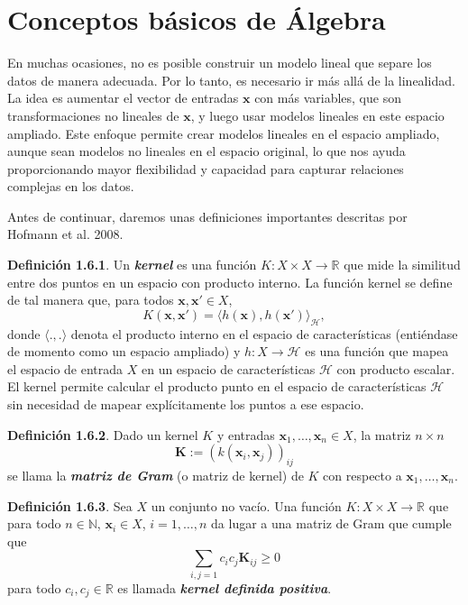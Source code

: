 \documentclass[letterpaper,12pt,oneside]{book}
\begin{document}
{\section{Conceptos básicos de Álgebra}
{
En muchas ocasiones, no es posible construir un modelo lineal que separe los datos de manera adecuada. Por lo tanto, es necesario ir más allá de la linealidad. La idea es aumentar el vector de entradas \( \textbf{x} \) con más variables, que son transformaciones no lineales de \( \textbf{x} \), y luego usar modelos lineales en este espacio ampliado. Este enfoque permite crear modelos lineales en el espacio ampliado, aunque sean modelos no lineales en el espacio original, lo que nos ayuda proporcionando mayor flexibilidad y capacidad para capturar relaciones complejas en los datos.

Antes de continuar, daremos unas definiciones importantes descritas por Hofmann et al. 2008.

    
    \textbf{Definición 1.6.1}. Un \textbf{\textit{kernel}} es una función \( K: X \times X \to \mathbb{R} \) que mide la similitud entre dos puntos en un espacio con producto interno. La función kernel se define de tal manera que, para todos \( \mathbf{x}, \mathbf{x}' \in X \),
    \begin{equation}
     K(\mathbf{x}, \mathbf{x}') = \langle h(\mathbf{x}), h(\mathbf{x}')\rangle_\mathcal{H} , \label{eq: 1.9}
    \end{equation}
    donde \(\langle .,. \rangle\) denota el producto interno en el espacio de características (entiéndase de momento como un espacio ampliado) y $h: X \to \mathcal{H} $ es una función que mapea el espacio de entrada $X$ en un espacio de características $\mathcal{H} $ con producto escalar. El kernel permite calcular el producto punto en el espacio de características $\mathcal{H} $ sin necesidad de mapear explícitamente los puntos a ese espacio.

    \textbf{Definición 1.6.2}. Dado un kernel \( K \) y entradas \( \mathbf{x}_1, \ldots, \mathbf{x}_n \in X \), la matriz \( n \times n \)  $$\mathbf{K} := (k(\mathbf{x}_i, \mathbf{x}_j))_{ij}$$  se llama la \textit{\textbf{matriz de Gram}} (o matriz de kernel) de \( K \) con respecto a \( \mathbf{x}_1, \ldots, \mathbf{x}_n \).

    \textbf{Definición 1.6.3}. Sea \( X \) un conjunto no vacío. Una función \( K: X \times X \to \mathbb{R} \) que para todo \( n \in \mathbb{N} \), \( \mathbf{x}_i \in X \), \( i =1, \dots, n \) da lugar a una matriz de Gram que cumple que 
    \begin{equation}
        \sum_{i,j=1} c_i c_j \mathbf{K}_{ij} \geq 0
    \end{equation}
    para todo $c_i, c_j \in \mathbb{R}$ es llamada  \textit{\textbf{kernel definida positiva}}.
    
}}
\end{document}
